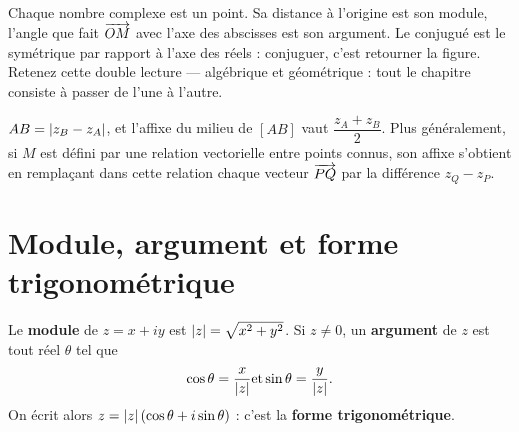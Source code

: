 \begin{visualisation}
\begin{center}
\end{center}

Chaque nombre complexe est un point. Sa distance à l'origine est son module,
l'angle que fait $\overrightarrow{OM}$ avec l'axe des abscisses est son argument. Le
conjugué est le symétrique par rapport à l'axe des réels : conjuguer, c'est
retourner la figure. Retenez cette double lecture — algébrique et
géométrique : tout le chapitre consiste à passer de l'une à l'autre.
\end{visualisation}

\begin{propriete}
$AB = \left|z_{B}-z_{A}\right|$, et l'affixe du milieu de $[AB]$ vaut
$\dfrac{z_{A}+z_{B}}{2}$. Plus généralement, si $M$ est défini par une
relation vectorielle entre points connus, son affixe s'obtient en remplaçant
dans cette relation chaque vecteur $\overrightarrow{PQ}$ par la différence
$z_{Q}-z_{P}$.
\end{propriete}

\section{Module, argument et forme trigonométrique}

\begin{definition}
Le \textbf{module} de $z = x+iy$ est $\left|z\right| = \sqrt{x^{2}+y^{2}}$. Si
$z \neq 0$, un \textbf{argument} de $z$ est tout réel $\theta$ tel que
\[
  \cos\theta = \frac{x}{\left|z\right|} \text{et}
  \sin\theta = \frac{y}{\left|z\right|}.
\]
On écrit alors $z = \left|z\right|\left(\cos\theta+i\sin\theta\right)$ :
c'est la \textbf{forme trigonométrique}.
\end{definition}

